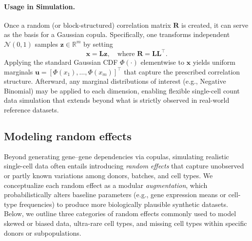 \documentclass{article}
\begin{document}
\paragraph{Usage in Simulation.}
Once a random (or block-structured) correlation matrix $\mathbf{R}$ is created, it can serve as the basis for a Gaussian copula. Specifically, one transforms independent $\mathcal{N}(0,1)$ samples $\mathbf{z}\in\mathbb{R}^m$ by setting
\[
\mathbf{x} = \mathbf{L} \mathbf{z}, 
\quad \text{where } \mathbf{R} = \mathbf{L}\mathbf{L}^\top.
\]
Applying the standard Gaussian CDF $\Phi(\cdot)$ elementwise to $\mathbf{x}$ yields uniform marginals $\mathbf{u} = [\Phi(x_1), \dots, \Phi(x_m)]^\top$ that capture the prescribed correlation structure. Afterward, any marginal distributions of interest (e.g., Negative Binomial) may be applied to each dimension, enabling flexible single-cell count data simulation that extends beyond what is strictly observed in real-world reference datasets.


\subsection{Modeling random effects}
\label{sec:randfxaugment}




Beyond generating gene--gene dependencies via copulas, simulating realistic single-cell data often entails introducing \emph{random effects} that capture unobserved or partly known variations among donors, batches, and cell types. We conceptualize each random effect as a modular \emph{augmentation}, which probabilistically alters baseline parameters (e.g., gene expression means or cell-type frequencies) to produce more biologically plausible synthetic datasets. Below, we outline three categories of random effects commonly used to model skewed or biased data, ultra-rare cell types, and missing cell types within specific donors or subpopulations.
\end{document}
